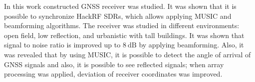 \documentclass[../gnss_interference_resistant_thesis.tex]{subfiles}
\begin{document}
{In this work constructed GNSS receiver was studied. It was shown that it is possible
to synchronize HackRF SDRs, which allows applying MUSIC and beamforming algorithms.
The receiver was studied in different environments: open field, low reflection, and urbanistic with tall buildings.
It was shown that signal to noise ratio
is improved up to $8\ \mathrm{dB}$ by applying beamforming. Also, it was revealed that
by using MUSIC, it is possible to detect the angle of arrival of GNSS signals and also,
it is possible to see reflected signals; when array processing was applied,
deviation of receiver coordinates was improved.

}
\end{document}
